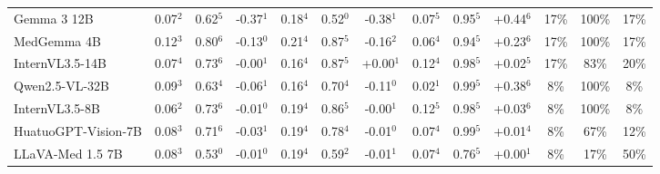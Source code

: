 \documentclass{article}
\begin{document}
\begin{table}[t]
{\begin{tabular}{l@{\hspace{3pt}}ccc@{\hspace{4pt}}ccc@{\hspace{4pt}}ccc@{\hspace{4pt}}ccc}
Gemma 3 12B & \cellcolor{cfSage2}0.07$^{2}$ & \cellcolor{cfSage2}0.62$^{5}$ & \cellcolor{cfSlate4}-0.37$^{1}$ & \cellcolor{cfSage3}0.18$^{4}$ & \cellcolor{cfSage1}0.52$^{0}$ & \cellcolor{cfSlate4}-0.38$^{1}$ & \cellcolor{cfSage2}0.07$^{5}$ & \cellcolor{cfSage4}0.95$^{5}$ & \cellcolor{cfTerra4}+0.44$^{6}$ & \cellcolor{cfTerra3}17\% & \cellcolor{cfTerra4}100\% & 17\% \\
MedGemma 4B & \cellcolor{cfSage3}0.12$^{3}$ & \cellcolor{cfSage3}0.80$^{6}$ & \cellcolor{cfSlate3}-0.13$^{0}$ & \cellcolor{cfSage4}0.21$^{4}$ & \cellcolor{cfSage3}0.87$^{5}$ & \cellcolor{cfSlate3}-0.16$^{2}$ & \cellcolor{cfSage2}0.06$^{4}$ & \cellcolor{cfSage4}0.94$^{5}$ & \cellcolor{cfTerra3}+0.23$^{6}$ & \cellcolor{cfTerra3}17\% & \cellcolor{cfTerra4}100\% & 17\% \\
InternVL3.5-14B & \cellcolor{cfSage2}0.07$^{4}$ & \cellcolor{cfSage2}0.73$^{6}$ & \cellcolor{cfSlate1}-0.00$^{1}$ & \cellcolor{cfSage3}0.16$^{4}$ & \cellcolor{cfSage3}0.87$^{5}$ & \cellcolor{cfTerra1}+0.00$^{1}$ & \cellcolor{cfSage3}0.12$^{4}$ & \cellcolor{cfSage4}0.98$^{5}$ & \cellcolor{cfTerra1}+0.02$^{5}$ & \cellcolor{cfTerra3}17\% & \cellcolor{cfTerra3}83\% & 20\% \\
Qwen2.5-VL-32B & \cellcolor{cfSage2}0.09$^{3}$ & \cellcolor{cfSage2}0.63$^{4}$ & \cellcolor{cfSlate2}-0.06$^{1}$ & \cellcolor{cfSage3}0.16$^{4}$ & \cellcolor{cfSage2}0.70$^{4}$ & \cellcolor{cfSlate3}-0.11$^{0}$ & \cellcolor{cfSage1}0.02$^{1}$ & \cellcolor{cfSage4}0.99$^{5}$ & \cellcolor{cfTerra4}+0.38$^{6}$ & \cellcolor{cfTerra2}8\% & \cellcolor{cfTerra4}100\% & 8\% \\
InternVL3.5-8B & \cellcolor{cfSage2}0.06$^{2}$ & \cellcolor{cfSage2}0.73$^{6}$ & \cellcolor{cfSlate1}-0.01$^{0}$ & \cellcolor{cfSage3}0.19$^{4}$ & \cellcolor{cfSage3}0.86$^{5}$ & \cellcolor{cfSlate1}-0.00$^{1}$ & \cellcolor{cfSage2}0.12$^{5}$ & \cellcolor{cfSage4}0.98$^{5}$ & \cellcolor{cfTerra2}+0.03$^{6}$ & \cellcolor{cfTerra2}8\% & \cellcolor{cfTerra4}100\% & 8\% \\
HuatuoGPT-Vision-7B & \cellcolor{cfSage2}0.08$^{3}$ & \cellcolor{cfSage2}0.71$^{6}$ & \cellcolor{cfSlate2}-0.03$^{1}$ & \cellcolor{cfSage3}0.19$^{4}$ & \cellcolor{cfSage3}0.78$^{4}$ & \cellcolor{cfSlate1}-0.01$^{0}$ & \cellcolor{cfSage2}0.07$^{4}$ & \cellcolor{cfSage4}0.99$^{5}$ & \cellcolor{cfTerra1}+0.01$^{4}$ & \cellcolor{cfTerra2}8\% & \cellcolor{cfTerra3}67\% & 12\% \\
LLaVA-Med 1.5 7B & \cellcolor{cfSage2}0.08$^{3}$ & \cellcolor{cfSage1}0.53$^{0}$ & \cellcolor{cfSlate1}-0.01$^{0}$ & \cellcolor{cfSage3}0.19$^{4}$ & \cellcolor{cfSage1}0.59$^{2}$ & \cellcolor{cfSlate1}-0.01$^{1}$ & \cellcolor{cfSage2}0.07$^{4}$ & \cellcolor{cfSage3}0.76$^{5}$ & \cellcolor{cfTerra1}+0.00$^{1}$ & \cellcolor{cfTerra2}8\% & \cellcolor{cfTerra2}17\% & 50\% \\

\end{tabular}}
\end{table}
\end{document}
